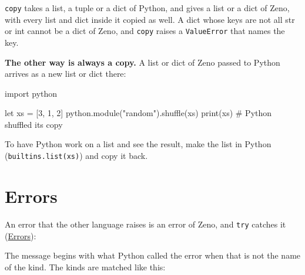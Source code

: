 \verb|copy| takes a list, a tuple or a dict of Python, and gives a list
or a dict of Zeno, with every list and dict inside it copied as well.
A dict whose keys are not all str or int cannot be a dict of Zeno, and
\verb|copy| raises a \verb|ValueError| that names the key.

\textbf{The other way is always a copy.} A list or dict of Zeno passed
to Python arrives as a new list or dict there:

\begin{zeno}[file=shuffle.zeno, dir=python]
import python

let xs = [3, 1, 2]
python.module("random").shuffle(xs)
print(xs)        # Python shuffled its copy
\end{zeno}

To have Python work on a list and see the result, make the list in
Python (\verb|builtins.list(xs)|) and copy it back.

\section{Errors}

An error that the other language raises is an error of Zeno, and
\verb|try| catches it (\hyperref[ch-errors]{Errors}):

\begin{zeno}[file=oops.zeno, dir=python]
import python

let json = python.module("json")
try {
    json.loads("{oops")
} except ValueError as error {
    print(error.message)
}
\end{zeno}

The message begins with what Python called the error when that is not
the name of the kind. The kinds are matched like this:

